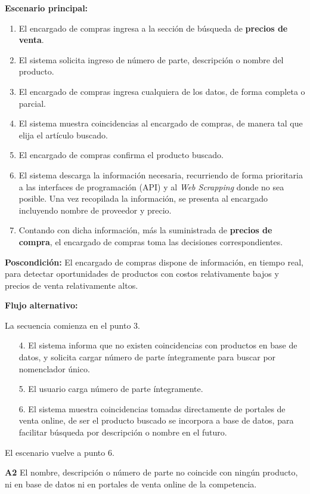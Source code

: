 \textbf{Escenario principal:}
\begin{enumerate}
	\item El encargado de compras ingresa a la sección de búsqueda de \textbf{precios de venta}.
	\item El sistema solicita ingreso de número de parte, descripción o nombre del producto.
	\item El encargado de compras ingresa cualquiera de los datos, de forma completa o parcial.
	\item El sistema muestra coincidencias al encargado de compras, de manera tal que elija el artículo buscado.
	\item El encargado de compras confirma el producto buscado.
	\item El sistema descarga la información necesaria, 
	recurriendo de forma prioritaria a las interfaces de programación (API)
	y al \textit{Web Scrapping} donde no sea posible. Una vez recopilada la información, 
	se presenta al encargado incluyendo nombre de proveedor y precio.
	\item Contando con dicha información, más la suministrada de \textbf{precios de compra},
	el encargado de compras toma las decisiones correspondientes.
\end{enumerate}

\textbf{Poscondición:}
El encargado de compras dispone de información, 
en tiempo real, 
para detectar oportunidades de productos con costos relativamente bajos y precios de venta relativamente altos.

\textbf{Flujo alternativo:}

La secuencia comienza en el punto 3.

\begin{enumerate}
	\item[4.] El sistema informa que no existen coincidencias con productos en base de datos,
	y solicita cargar número de parte íntegramente para buscar por nomenclador único.
	\item[5.] El usuario carga número de parte íntegramente.
	\item[6.] El sistema muestra coincidencias tomadas directamente de portales de venta online,
	de ser el producto buscado se incorpora a base de datos,
	para facilitar búsqueda por descripción o nombre en el futuro.
\end{enumerate}

El escenario vuelve a punto 6.

\textbf{A2} El nombre, descripción o número de parte no coincide con ningún producto, ni en base de datos ni en portales de venta online de la competencia.

